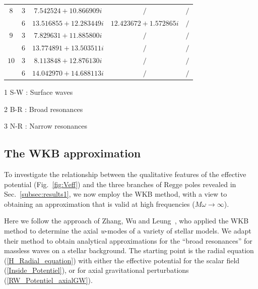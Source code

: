 \documentclass[aps,prd,longbibliography,reprint,twocolumn,amsmath,amssymb,amsfonts,showpacs,footnote,superscriptaddress]{revtex4-1}%
\begin{document}
\begin{table}[htp]
\begin{threeparttable}[htp]
\begin{ruledtabular}
\begin{tabular}{ccccc}
$8$  & $3$  & $7.542524+10.866909 i $  & $ /$  & $/ $   \\
     & $6$  & $13.516855+12.283449 i $  & $12.423672+1.572865 i $  & $/ $   \\

$9$  & $3$  & $7.829631+11.885800 i   $  & $/ $  & $/ $   \\
     & $6$  & $13.774891+13.503511 i  $  & $/ $  & $/ $   \\

$10$ & $3$  & $8.113848+12.876130 i $  & $/ $  & $/ $    \\
     & $6$  & $14.042970+14.688113 i $  & $ /$  & $/ $   \\
\end{tabular}
\end{ruledtabular}
\begin{tablenotes}
     \item[1] S-W : Surface waves
     \item[2] B-R : Broad resonances
     \item[3] N-R : Narrow  resonances
   \end{tablenotes}
\end{threeparttable}
\end{table}
\endgroup


 \subsection{The WKB approximation}\label{subsec:WKB}


To investigate the relationship between the qualitative features of the effective potential (Fig.~\ref{fig:Veff}) and the three branches of Regge poles revealed in Sec.~\ref{subsec:results1}, we now employ the WKB method, with a view to obtaining an approximation that is valid at high frequencies ($M\omega \rightarrow \infty$).

Here we follow the approach of Zhang, Wu and Leung~\cite{Zhang:2011pq}, who applied the WKB method to determine the axial \textit{w}-modes of a variety of stellar models. We adapt their method to obtain analytical approximations for the ``broad resonances'' for massless waves on a stellar background. The starting point is the radial equation (\ref{H_Radial_equation}) with either the effective potential for the scalar field (\ref{Inside_Potentiel}), or for axial gravitational perturbations (\ref{RW_Potentiel_axialGW}).
\end{document}
